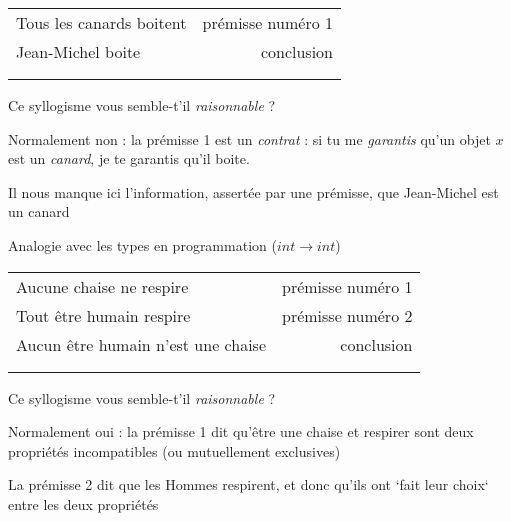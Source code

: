 \begin{frame}
	
\begin{tabular}{lr}
Tous les canards boitent & \hspace{2cm} prémisse numéro 1 \\ \cline{1-1}
 Jean-Michel boite & conclusion\\ \\ \\
\end{tabular}

\pause

Ce syllogisme vous semble-t'il \textit{raisonnable} ? \pause \newline 

Normalement non \pause : la prémisse 1 est un \textit{contrat} : si tu me \textit{garantis} qu'un objet $x$ est un \textit{canard}, je te garantis qu'il boite.\newline \pause

Il nous manque ici l'information, assertée par une prémisse, que Jean-Michel est un canard \pause \newline


Analogie avec les types en programmation ($int \rightarrow int$)

\end{frame}


\begin{frame}
\begin{tabular}{lr}
Aucune chaise ne respire& \hspace{1cm} prémisse numéro 1 \\ 
Tout être humain respire & prémisse numéro 2 \\ \cline{1-1}
Aucun être humain n'est une chaise & conclusion\\ \\ \\
\end{tabular}

\pause

Ce syllogisme vous semble-t'il \textit{raisonnable} ? \pause \newline 

Normalement oui \pause : la prémisse 1 dit qu'être une chaise et respirer sont deux propriétés incompatibles (ou mutuellement exclusives)\newline \pause

La prémisse 2 dit que les Hommes respirent, et donc qu'ils ont `fait leur choix` entre les deux propriétés

\end{frame}


